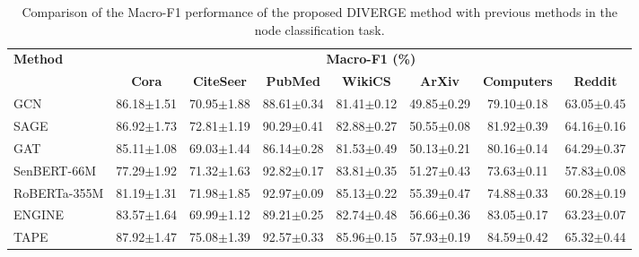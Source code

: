 \documentclass[a4paper,fleqn]{cas-sc}
\begin{document}
\begin{table}[htbp]
\centering
\caption{Comparison of the Macro-F1 performance of the proposed DIVERGE method with previous methods in the node classification task.}
\label{tab:diverge_node_classification_macro_f1_sota}

\small
\setlength{\tabcolsep}{3pt}
\begin{tabular*}{\textwidth}{@{\extracolsep{\fill}} lccccccc @{}}
\toprule
\multirow{2}{*}{\textbf{Method}} & \multicolumn{7}{c}{\textbf{Macro-F1 (\%)}} \\
\cmidrule(lr){2-8}
 & \textbf{Cora} & \textbf{CiteSeer} & \textbf{PubMed} & \textbf{WikiCS} & \textbf{ArXiv} & \textbf{Computers} & \textbf{Reddit} \\
\midrule

GCN          & 86.18{\scriptsize$\pm$1.51} & 70.95{\scriptsize$\pm$1.88} & 88.61{\scriptsize$\pm$0.34} & 81.41{\scriptsize$\pm$0.12} & 49.85{\scriptsize$\pm$0.29} & 79.10{\scriptsize$\pm$0.18} & 63.05{\scriptsize$\pm$0.45} \\
SAGE         & 86.92{\scriptsize$\pm$1.73} & 72.81{\scriptsize$\pm$1.19} & 90.29{\scriptsize$\pm$0.41} & 82.88{\scriptsize$\pm$0.27} & 50.55{\scriptsize$\pm$0.08} & 81.92{\scriptsize$\pm$0.39} & 64.16{\scriptsize$\pm$0.16} \\
GAT          & 85.11{\scriptsize$\pm$1.08} & 69.03{\scriptsize$\pm$1.44} & 86.14{\scriptsize$\pm$0.28} & 81.53{\scriptsize$\pm$0.49} & 50.13{\scriptsize$\pm$0.21} & 80.16{\scriptsize$\pm$0.14} & 64.29{\scriptsize$\pm$0.37} \\
SenBERT-66M  & 77.29{\scriptsize$\pm$1.92} & 71.32{\scriptsize$\pm$1.63} & 92.82{\scriptsize$\pm$0.17} & 83.81{\scriptsize$\pm$0.35} & 51.27{\scriptsize$\pm$0.43} & 73.63{\scriptsize$\pm$0.11} & 57.83{\scriptsize$\pm$0.08} \\
RoBERTa-355M & 81.19{\scriptsize$\pm$1.31} & 71.98{\scriptsize$\pm$1.85} & 92.97{\scriptsize$\pm$0.09} & 85.13{\scriptsize$\pm$0.22} & 55.39{\scriptsize$\pm$0.47} & 74.88{\scriptsize$\pm$0.33} & 60.28{\scriptsize$\pm$0.19} \\
ENGINE       & 83.57{\scriptsize$\pm$1.64} & 69.99{\scriptsize$\pm$1.12} & 89.21{\scriptsize$\pm$0.25} & 82.74{\scriptsize$\pm$0.48} & 56.66{\scriptsize$\pm$0.36} & 83.05{\scriptsize$\pm$0.17} & 63.23{\scriptsize$\pm$0.07} \\
TAPE         & 87.92{\scriptsize$\pm$1.47} & 75.08{\scriptsize$\pm$1.39} & 92.57{\scriptsize$\pm$0.33} & 85.96{\scriptsize$\pm$0.15} & 57.93{\scriptsize$\pm$0.19} & 84.59{\scriptsize$\pm$0.42} & 65.32{\scriptsize$\pm$0.44} \\

\end{tabular*}
\end{table}
\end{document}
